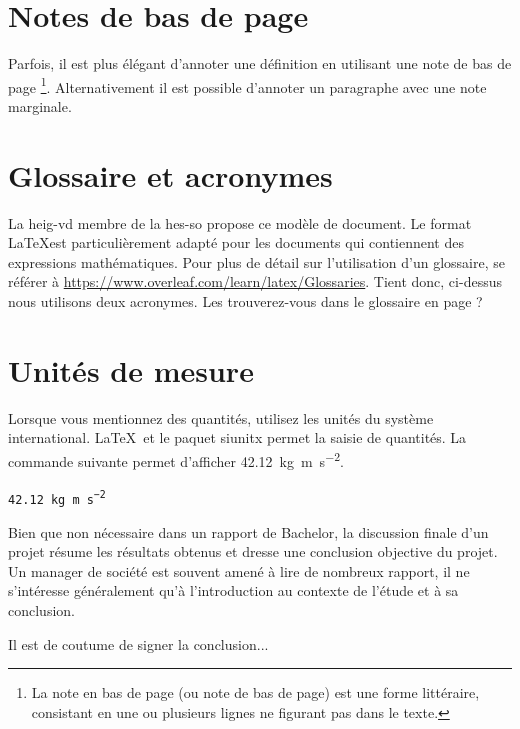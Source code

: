 \documentclass[
    iai, %
    eai, %
]{heig-tb}
\begin{document}
\section{Notes de bas de page}

 Parfois, il est plus élégant d'annoter une définition en utilisant une note de bas de page \footnote{La note en bas de page (ou note de bas de page) est une forme littéraire, consistant en une ou plusieurs lignes ne figurant pas dans le texte.}. Alternativement il est possible d'annoter un paragraphe avec une note marginale.

\section{Glossaire et acronymes}

La \Gls{heig-vd} membre de la \Gls{hes-so} propose ce modèle de document. Le format \LaTeX est particulièrement adapté pour les documents qui contiennent des expressions mathématiques. Pour plus de détail sur l'utilisation d'un glossaire, se référer à \url{https://www.overleaf.com/learn/latex/Glossaries}. Tient donc, ci-dessus nous utilisons deux acronymes. Les trouverez-vous dans le glossaire en page \pageref{glossaire} ?

\section{Unités de mesure}

Lorsque vous mentionnez des quantités, utilisez les unités du système international. \LaTeX~et le paquet \textsf{siunitx} permet la saisie de quantités. La commande suivante permet d'afficher \SI{42.12}{\kilo\gram\metre\per\square\second}.\par

\texttt{\SI{42.12}{\kilo\gram\metre\per\square\second}}\par

Bien que non nécessaire dans un rapport de Bachelor, la discussion finale d'un projet résume les résultats obtenus et dresse une conclusion objective du projet. Un manager de société est souvent amené à lire de nombreux rapport, il ne s'intéresse généralement qu'à l'introduction au contexte de l'étude et à sa conclusion.

Il est de coutume de signer la conclusion...

\vfil
\hspace{8cm}\makeatletter\@author\makeatother\par
\hspace{8cm}\begin{minipage}{5cm}
  \printsignature
\end{minipage}
\clearpage
\end{document}

